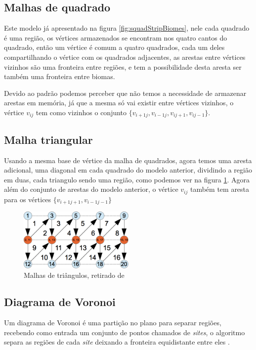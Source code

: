 \subsection{Malhas de quadrado}
Este modelo já apresentado na figura \ref{fig:squadStripBiomes}, nele cada
quadrado é uma região, os vértices armazenados se encontram nos quatro cantos
do quadrado, então um vértice é comum a quatro quadrados, cada um deles
compartilhando o vértice com os quadrados adjacentes, as arestas entre vértices
vizinhos são uma fronteira entre regiões, e tem a possibilidade desta aresta ser
também uma fronteira entre biomas.

Devido ao padrão podemos perceber que não temos a necessidade de armazenar arestas
em memória, já que a mesma só vai existir entre vértices vizinhos, o vértice
$v_{i j}$ tem como vizinhos o conjunto $\{v_{i+1 j}, v_{i-1 j}, v_{i j+1}, v_{i j-1}\}$.
\subsection{Malha triangular}
Usando a mesma base de vértice da malha de quadrados, agora temos uma aresta
adicional, uma diagonal em cada quadrado do modelo anterior, dividindo a região
em duas, cada triangulo sendo uma região, como podemos ver na figura \ref{fig:vbo}.
Agora além do conjunto de arestas do modelo anterior, o vértice $v_{i j}$ também tem
aresta para os vértices $\{v_{i+1 j+1}, v_{i-1 j-1}\}$
\begin{figure}[H]
    \centering
    \includegraphics[width=0.5\textwidth]{figuras/vbo.png}
    \caption{Malhas de triângulos, retirado de \cite{androidtrianglestrip}}
    \label{fig:vbo}
\end{figure}


\subsection{Diagrama de Voronoi}
Um diagrama de Voronoi é uma partição no plano para separar regiões, recebendo
como entrada um conjunto de pontos chamados de \textit{sites}, o algoritmo
separa as regiões de cada \textit{site} deixando a fronteira equidistante entre eles
\cite{fortune1987sweepline}.

